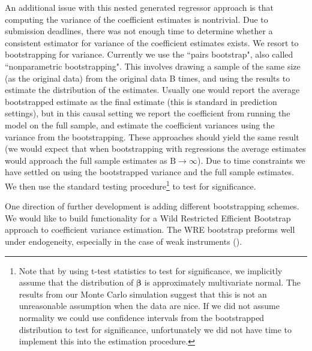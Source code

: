\documentclass[12pt]{article}
\begin{document}
An additional issue with this nested generated regressor approach is that computing the variance of the coefficient estimates is nontrivial. Due to submission deadlines, there was not enough time to determine whether a consistent estimator for variance of the coefficient estimates exists. We resort to bootstrapping for variance. Currently we use the ``pairs bootstrap", also called ``nonparametric bootstrapping". This involves drawing a sample of the same size (as the original data) from the original data B times, and using the results to estimate the distribution of the estimates. Usually one would report the average bootstrapped estimate as the final estimate (this is standard in prediction settings), but in this causal setting we report the coefficient from running the model on the full sample, and estimate the coefficient variances using the variance from the bootstrapping. These approaches should yield the same result (we would expect that when bootstrapping with regressions the average estimates would approach the full sample estimates as $\mathrm{B} \longrightarrow \infty$). Due to time constraints we have settled on using the bootstrapped variance and the full sample estimates. We then use the standard testing procedure\footnote{Note that by using t-test statistics to test for significance, we implicitly assume that the distribution of $\bm{\beta}$ is approximately multivariate normal. The results from our Monte Carlo simulation suggest that this is not an unreasonable assumption when the data are nice. If we did not assume normality we could use confidence intervals from the bootstrapped distribution to test for significance, unfortunately we did not have time to implement this into the estimation procedure.} to test for significance.

One direction of further development is adding different bootstrapping schemes. We would like to build functionality for a Wild Restricted Efficient Bootstrap approach to coefficient variance estimation. The WRE bootstrap preforms well under endogeneity, especially in the case of weak instruments (\cite{wild_boot}).

\end{document}
